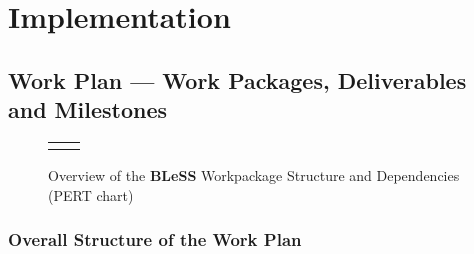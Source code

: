 \documentclass[a4paper,11pt]{article}
\newcommand{\project}[1]{\textbf{#1}\xspace}
\newcommand{\BLESS}{\project{BLeSS}}
\newcommand{\TheProject}{\BLESS}
\begin{document}
\clearpage
\section{Implementation}

\subsection{Work Plan --- Work Packages, Deliverables and Milestones}
\label{sect:workplan}


\begin{figure}[tp]
\begin{center}
\vspace{-5mm}
\begin{tabular}{ll}
[scale=0.5]{RePhorm2Pert.pdf}
\end{tabular}
\caption{Overview of the \TheProject{} Workpackage Structure and Dependencies (PERT chart)}
\label{fig:wps}
\end{center}
\end{figure}

\subsubsection*{Overall Structure of the Work Plan}
\end{document}
